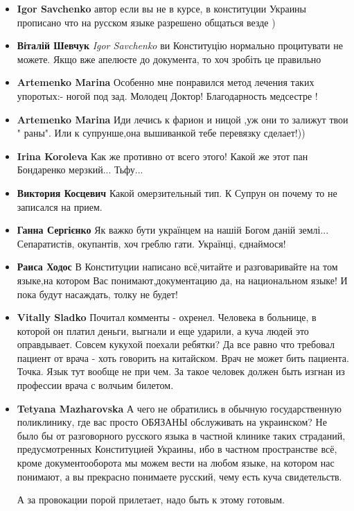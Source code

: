 \begin{itemize}
\item \textbf{Igor Savchenko}
автор если вы не в курсе, в конституции Украины прописано что на русском языке разрешено общаться везде )

\item \textbf{Віталій Шевчук}
        \emph{Igor Savchenko}
ви Конституцію нормально процитувати не можете. Якщо вже апелюєте до документа, то хоч зробіть це правильно

\item \textbf{Artemenko Marina}
Особенно мне понравился метод лечения таких упоротых:-
ногой под зад. Молодец Доктор! Благодарность медсестре !

\item \textbf{Artemenko Marina}
Иди лечись к фарион и ницой ,уж они то залижут твои " раны". Или к супрунше,она вышиванкой тебе перевязку сделает!))

\item \textbf{Irina Koroleva}
Как же противно от всего этого! Какой же этот пан Бондаренко мерзкий... Тьфу...

\item \textbf{Виктория Косцевич}
Какой омерзительный тип.
К Супрун он почему то не записался на прием.

\item \textbf{Ганна Сергієнко}
Як важко бути українцем на нашій Богом даній землі... Сепаратистів, окупантів, хоч греблю гати. Українці, єднаймося!

\item \textbf{Раиса Ходос}
В Конституции написано всё,читайте и разговаривайте на том языке,на котором Вас понимают,документацию да, на национальном языке! И пока будут насаждать, толку не будет!

\item \textbf{Vitally Sladko}
Почитал комменты - охренел.
Человека в больнице, в которой он платил деньги, выгнали и еще ударили, а куча людей это оправдывает.
Совсем кукухой поехали ребятки?
Да все равно что требовал пациент от врача - хоть говорить на китайском. Врач не может бить пациента. Точка.
Язык тут вообще не при чем.
За такое человек должен быть изгнан из профессии врача с волчьим билетом.

\item \textbf{Tetyana Mazharovska}
А чего не обратились в обычную государственную поликлинику, где вас просто
ОБЯЗАНЫ обслуживать на украинском?  Не было бы от разговорного русского языка в
частной клинике таких страданий, предусмотренных Конституцией Украины, ибо в
частном пространстве всё, кроме документооборота мы можем вести на любом языке,
на котором нас понимают, а вы прекрасно понимаете русский, чему есть куча
свидетельств.

А за провокации порой прилетает, надо быть к этому готовым.

\end{itemize}
